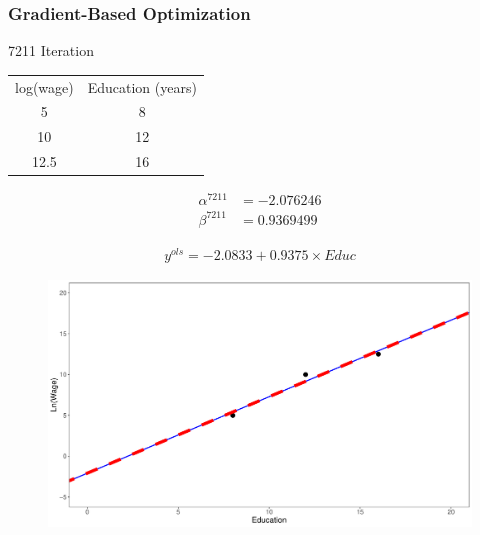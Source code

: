 \documentclass[
  shownotes,
  xcolor={svgnames},
  hyperref={colorlinks,citecolor=DarkBlue,linkcolor=DarkRed,urlcolor=DarkBlue}
  , aspectratio=169]{beamer}
\begin{document}
\begin{frame}[fragile]
\frametitle{Gradient-Based Optimization}
\tiny
7211 Iteration
\begin{table}[]
\begin{tabular}{cc}
log(wage) & Education (years) \\
5         & 8                                                         \\
10        & 12                                                          \\
12.5      & 16                                                          \\
\end{tabular}
\end{table}



\begin{align}
\alpha^{7211} &=  -2.076246 \nonumber \\
\beta^{7211} &=  0.9369499 \nonumber
\end{align}


\begin{align}
y^{ols}=-2.0833 +  0.9375 \times Educ \nonumber
\end{align}


        \begin{figure}[H] \centering
            \captionsetup{justification=centering}  
            \includegraphics[scale=0.15]{figures/fig_1_7211.pdf}
    \end{figure}

 \end{frame}
\end{document}
